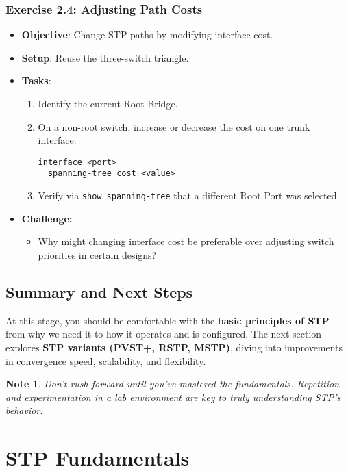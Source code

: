 \documentclass[a4paper]{report}
\newtheorem*{noteenv}{Note}
\begin{document}
\subsection*{Exercise 2.4: Adjusting Path Costs}
\begin{itemize}
  \item \textbf{Objective}: Change STP paths by modifying interface cost.
  \item \textbf{Setup}: Reuse the three-switch triangle.
  \item \textbf{Tasks}:
  \begin{enumerate}
    \item Identify the current Root Bridge.
    \item On a non-root switch, increase or decrease the cost on one trunk interface:
\begin{lstlisting}
interface <port>
  spanning-tree cost <value>
\end{lstlisting}
    \item Verify via \texttt{show spanning-tree} that a different Root Port was selected.
  \end{enumerate}

\item \textbf{Challenge:}
\begin{itemize}
  \item Why might changing interface cost be preferable over adjusting switch priorities in certain designs?
\end{itemize}
\end{itemize}
\section*{Summary and Next Steps}
At this stage, you should be comfortable with the \textbf{basic principles of STP}—from why we need it to how it operates and is configured. The next section explores \textbf{STP variants (PVST+, RSTP, MSTP)}, diving into improvements in convergence speed, scalability, and flexibility.

\begin{noteenv}
     Don’t rush forward until you’ve mastered the fundamentals. Repetition and experimentation in a lab environment are key to truly understanding STP’s behavior.
\end{noteenv}



\chapter{STP Fundamentals}
\end{document}
